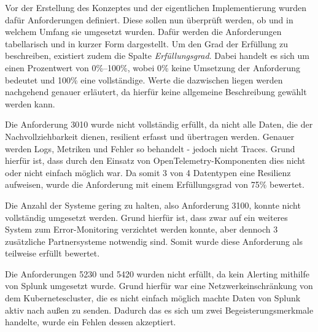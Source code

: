 
Vor der Erstellung des Konzeptes und der eigentlichen Implementierung wurden dafür Anforderungen definiert. Diese sollen nun überprüft werden, ob und in welchem Umfang sie umgesetzt wurden. Dafür werden die Anforderungen tabellarisch und in kurzer Form dargestellt. Um den Grad der Erfüllung zu beschreiben, existiert zudem die Spalte \textit{Erfüllungsgrad}. Dabei handelt es sich um einen Prozentwert von 0\%--100\%, wobei 0\% keine Umsetzung der Anforderung bedeutet und 100\% eine vollständige. Werte die dazwischen liegen werden nachgehend genauer erläutert, da hierfür keine allgemeine Beschreibung gewählt werden kann.
	


Die Anforderung 3010 wurde nicht vollständig erfüllt, da nicht alle Daten, die der Nachvollziehbarkeit dienen, resilient erfasst und übertragen werden. Genauer werden Logs, Metriken und Fehler so behandelt - jedoch nicht Traces. Grund hierfür ist, dass durch den Einsatz von OpenTelemetry-Komponenten dies nicht oder nicht einfach möglich war. Da somit 3 von 4 Datentypen eine Resilienz aufweisen, wurde die Anforderung mit einem Erfüllungsgrad von 75\% bewertet.

Die Anzahl der Systeme gering zu halten, also Anforderung 3100, konnte nicht vollständig umgesetzt werden. Grund hierfür ist, dass zwar auf ein weiteres System zum Error-Monitoring verzichtet werden konnte, aber dennoch 3 zusätzliche Partnersysteme notwendig sind. Somit wurde diese Anforderung als teilweise erfüllt bewertet.

Die Anforderungen 5230 und 5420 wurden nicht erfüllt, da kein Alerting mithilfe von Splunk umgesetzt wurde. Grund hierfür war eine Netzwerkeinschränkung von dem Kuber\-netes\-cluster, die es nicht einfach möglich machte Daten von Splunk aktiv nach außen zu senden. Dadurch das es sich um zwei Begeisterungsmerkmale handelte, wurde ein Fehlen dessen akzeptiert.